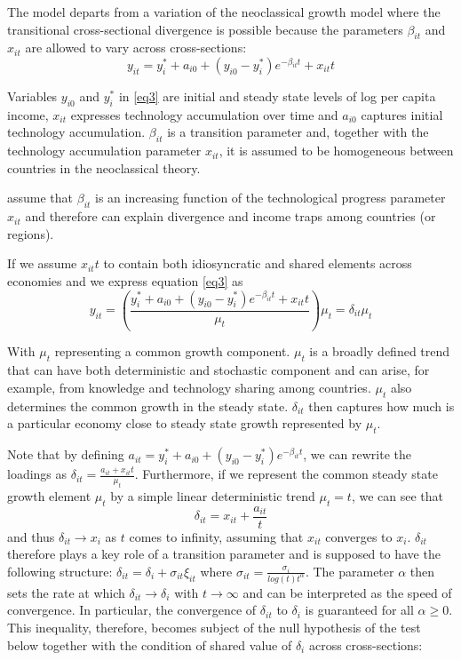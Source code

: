 \documentclass[11pt]{article}
\begin{document}
The model departs from a variation of the neoclassical growth model where the transitional cross-sectional divergence is possible because the parameters $\beta_{it}$ and $x_{it}$ are allowed to vary across cross-sections:
\begin{equation} \label{eq3}
 y_{it} = y_i^* + a_{i0} + (y_{i0} - y_i^*)e^{-\beta_{it}t} + x_{it}t 
\end{equation}

 Variables $y_{i0}$ and $y_{i}^{*}$ in \eqref{eq3} are initial and steady state levels of log per capita income, $x_{it}$ expresses technology accumulation over time and $a_{i0}$ captures initial technology accumulation. $\beta_{it}$ is a transition parameter and, together with the technology accumulation parameter $x_{it}$, it is assumed to be homogeneous between countries in the neoclassical theory.

\citeauthor{phillips2007transition} assume that $\beta_{it}$ is an increasing function of the technological progress parameter $x_{it}$ and therefore can explain divergence and income traps among countries (or regions).

If we assume $x_{it}t$ to contain both idiosyncratic and shared elements across economies and we express equation \eqref{eq3} as
\begin{equation} \label{eq4} y_{it} = \left(\frac{ y_i^* + a_{i0} + (y_{i0} - y_i^*)e^{-\beta_{it}t} + x_{it}t}{\mu_t}\right)\mu_t = \delta_{it}\mu_t  \end{equation}


With $\mu_t$ representing a common growth component.
$\mu_t$ is a broadly defined trend that can have both deterministic and stochastic component and can arise, for example, from knowledge and technology sharing among countries. $\mu_t$ also determines the common growth in the steady state. $\delta_{it}$ then captures how much is a particular economy close to steady state growth represented by $\mu_t$.

Note that by defining \(a_{it} = y_i^* + a_{i0} + (y_{i0} - y_i^*)e^{-\beta_{it}t} \), we can rewrite the loadings as \(\delta_{it} = \frac{a_{it} + x_{it}t}{\mu_t}\). Furthermore, if we represent the common steady state growth element $\mu_t$ by a simple linear deterministic trend \(\mu_t = t\), we can see that
\begin{equation} \label{eq5}\delta_{it} = x_{it} + \frac{a_{it}}{t} \end{equation}  and thus \(\delta_{it} \rightarrow x_i\) as $t$ comes to infinity, assuming that $x_{it}$ converges to $x_{i}$. $\delta_{it}$ therefore plays a key role of a transition parameter and is supposed to have the following structure: \(\delta_{it} = \delta_{i} + \sigma_{it}\xi_{it}\) where \( \sigma_{it} = \frac{\sigma_{i}}{log(t)t^\alpha}\). The parameter $\alpha$ then sets the rate at which \(\delta_{it} \rightarrow \delta_{i}\) with \(t \rightarrow \infty\) and can be interpreted as the speed of convergence. In particular, the convergence of $\delta_{it}$ to $\delta_{i}$ is guaranteed for all \(\alpha \geq 0\). This inequality, therefore, becomes subject of the null hypothesis of the test below together with the condition of shared value of $\delta_{i}$ across cross-sections: 
\end{document}
